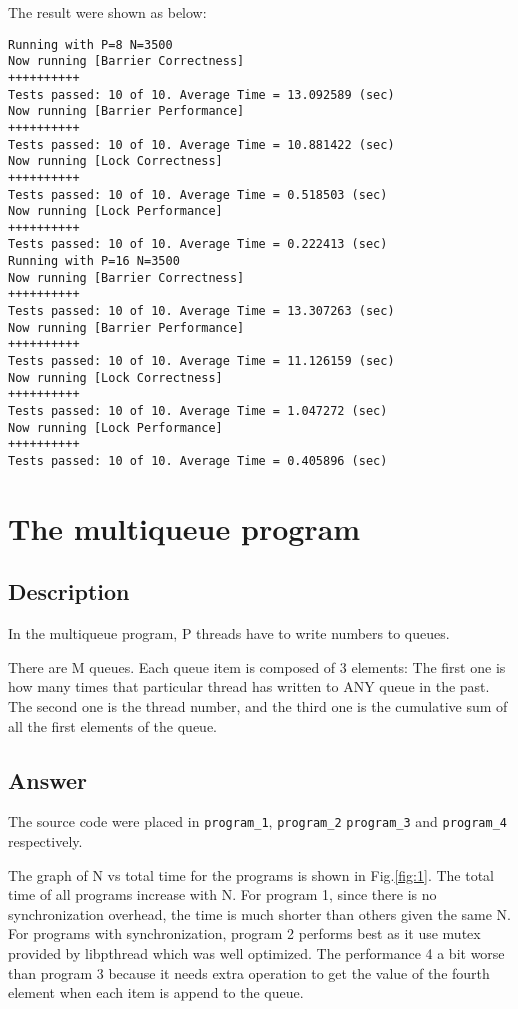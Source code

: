 \documentclass[12pt]{article}
\begin{document}
The result were shown as below:
\begin{verbatim}
Running with P=8 N=3500
Now running [Barrier Correctness]
++++++++++
Tests passed: 10 of 10. Average Time = 13.092589 (sec)
Now running [Barrier Performance]
++++++++++
Tests passed: 10 of 10. Average Time = 10.881422 (sec)
Now running [Lock Correctness]
++++++++++
Tests passed: 10 of 10. Average Time = 0.518503 (sec)
Now running [Lock Performance]
++++++++++
Tests passed: 10 of 10. Average Time = 0.222413 (sec)
Running with P=16 N=3500
Now running [Barrier Correctness]
++++++++++
Tests passed: 10 of 10. Average Time = 13.307263 (sec)
Now running [Barrier Performance]
++++++++++
Tests passed: 10 of 10. Average Time = 11.126159 (sec)
Now running [Lock Correctness]
++++++++++
Tests passed: 10 of 10. Average Time = 1.047272 (sec)
Now running [Lock Performance]
++++++++++
Tests passed: 10 of 10. Average Time = 0.405896 (sec)
\end{verbatim}

\section{The multiqueue program}
\subsection{Description}
In the multiqueue program, P threads have to write numbers to queues.

There are M queues. Each queue item is composed of 3 elements: The 
first one is how many times that particular thread has written to ANY 
queue in the past. The second one is the thread number, and the third 
one is the cumulative sum of all the first elements of the queue.

\subsection{Answer}
The source code were placed in \texttt{program\_1}, \texttt{program\_2}
\texttt{program\_3} and \texttt{program\_4} respectively.

The graph of N vs total time for the programs is shown in Fig.\ref{fig:1}.
The total time of all programs increase with N. For program 1, since there
is no synchronization overhead, the time is much shorter than others given
the same N. For programs with synchronization, program 2 performs best as it
use mutex provided by libpthread which was well optimized. The performance 4
a bit worse than program 3 because it needs extra operation to get the value
of the fourth element when each item is append to the queue.
\end{document}

